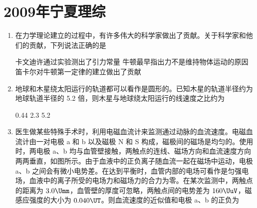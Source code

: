\documentclass[\gkver]{gaokaozhenti}
\begin{document}
\chapter{2009年宁夏理综}

\begin{enumerate}
\item
在力学理论建立的过程中，有许多伟大的科学家做出了贡献。关于科学家和他们的贡献，下列说法正确的是

{卡文迪许通过实验测出了引力常量}
{牛顿最早指出力不是维持物体运动的原因}
{笛卡尔对牛顿第一定律的建立做出了贡献}


\item
地球和木星绕太阳运行的轨道都可以看作是圆形的。已知木星的轨道半径约为地球轨道半径的 5.2 倍，则木星与地球绕太阳运行的线速度之比约为

{0.44}
{2.3}
{5.2}


\item
医生做某些特殊手术时，利用电磁血流计来监测通过动脉的血流速度。电磁血流计由一对电极 a 和 b 以及磁极 N 和 S 构成，磁极间的磁场是均匀的。使用时，两电极 a、b 均与血管壁接触，两触点的连线、磁场方向和血流速度方向两两垂直，如图所示。由于血液中的正负离子随血流一起在磁场中运动，电极 a、b 之间会有微小电势差。在达到平衡时，血管内部的电场可看作是匀强电场，血液中的离子所受的电场力和磁场力的合力为零。在某次监测中，两触点的距离为 $3.0\Umm$，血管壁的厚度可忽略，两触点间的电势差为 $160\UuV$，磁感应强度的大小为 $0.040\UT$。则血流速度的近似值和电极 a、b 的正负为


\end{enumerate}
\end{document}
